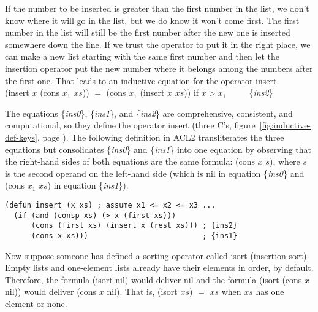 If the number to be inserted is greater than the first number
in the list, we don't know where it will go in the list,
but we do know it won't come first.
The first number in the list will still be the first number
after the new one is inserted somewhere down the line.
If we trust the operator to put it in the right place,
we can make a new list starting with the same first number
and then  let the insertion operator put the new number
where it belongs among the numbers after the first one.
That leads to an inductive equation for the operator \textsf{insert}.
\vspace{2mm}\\
\hspace*{5mm}\textsf{(insert $x$ (cons $x_1$ $xs$)) $=$ (cons $x_1$ (insert $x$ $xs$))} if $x > x_1$ ~~~~ \{\emph{ins2}\}
\vspace{2mm}

The equations \{\emph{ins0}\}, \{\emph{ins1}\}, and \{\emph{ins2}\}
are comprehensive, consistent, and computational,
so they define the operator \textsf{insert}
(three C's, figure~\ref{fig:inductive-def-keys}, page \pageref{fig:inductive-def-keys}).
The following definition in ACL2 transliterates the three equations
but consolidates \{\emph{ins0}\} and \{\emph{ins1}\} into one equation
by observing that the right-hand sides of both equations
are the same formula: \textsf{(cons $x$ $s$)}, where $s$ is the second operand
on the left-hand side
(which is \textsf{nil} in equation \{\emph{ins0}\} and
\textsf{(cons $x_1$ $xs$)} in equation \{\emph{ins1}\}).

\label{defun:insert-isort}
\begin{code}
\begin{verbatim}
(defun insert (x xs) ; assume x1 <= x2 <= x3 ...
  (if (and (consp xs) (> x (first xs)))
      (cons (first xs) (insert x (rest xs))) ; {ins2}
      (cons x xs)))                          ; {ins1}
\end{verbatim}
\end{code}

Now suppose someone has defined a sorting operator called \textsf{isort}
(insertion-sort).
Empty lists and one-element lists already have their
elements in order, by default.
Therefore, the formula \textsf{(isort nil}) would deliver \textsf{nil}
and the formula \textsf{(isort (cons $x$ nil))} would deliver
\textsf{(cons $x$ nil)}.
That is, \textsf{(isort $xs$) $=$ $xs$} when $xs$ has one element or none.

